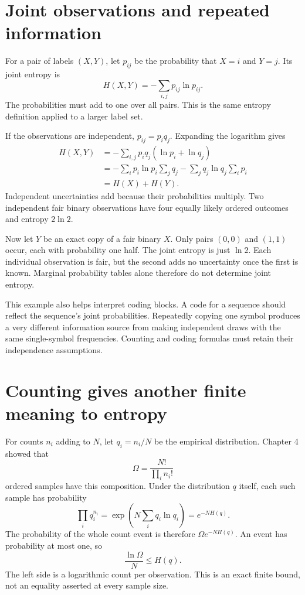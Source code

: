 \documentclass[11pt,oneside,openany]{book}
\theoremstyle{definition}
\theoremstyle{remark}
\numberwithin{equation}{chapter}
\begin{document}
\section{Joint observations and repeated information}\label{ch05-joint-observations-and-repeated-information}

For a pair of labels \((X,Y)\), let \(p_{ij}\) be the probability that \(X=i\) and \(Y=j\). Its joint entropy is \[H(X,Y)=-\sum_{i,j}p_{ij}\ln p_{ij}.\] The probabilities must add to one over all pairs. This is the same entropy definition applied to a larger label set.

If the observations are independent, \(p_{ij}=p_iq_j\). Expanding the logarithm gives \[\begin{aligned}
H(X,Y)
&=-\sum_{i,j}p_iq_j(\ln p_i+\ln q_j)\\
&=-\sum_i p_i\ln p_i\sum_jq_j
-\sum_jq_j\ln q_j\sum_i p_i\\
&=H(X)+H(Y).
\end{aligned}\] Independent uncertainties add because their probabilities multiply. Two independent fair binary observations have four equally likely ordered outcomes and entropy \(2\ln2\).

Now let \(Y\) be an exact copy of a fair binary \(X\). Only pairs \((0,0)\) and \((1,1)\) occur, each with probability one half. The joint entropy is just \(\ln2\). Each individual observation is fair, but the second adds no uncertainty once the first is known. Marginal probability tables alone therefore do not determine joint entropy.

This example also helps interpret coding blocks. A code for a sequence should reflect the sequence's joint probabilities. Repeatedly copying one symbol produces a very different information source from making independent draws with the same single-symbol frequencies. Counting and coding formulas must retain their independence assumptions.

\section{Counting gives another finite meaning to entropy}\label{ch05-counting-gives-another-finite-meaning-to-entropy}

For counts \(n_i\) adding to \(N\), let \(q_i=n_i/N\) be the empirical distribution. Chapter 4 showed that \[\Omega=\frac{N!}{\prod_i n_i!}\] ordered samples have this composition. Under the distribution \(q\) itself, each such sample has probability \[\prod_i q_i^{n_i}
=\exp\left(N\sum_i q_i\ln q_i\right)=e^{-NH(q)}.\] The probability of the whole count event is therefore \(\Omega e^{-NH(q)}\). An event has probability at most one, so \[\boxed{\frac{\ln\Omega}{N}\leq H(q).}\] The left side is a logarithmic count per observation. This is an exact finite bound, not an equality asserted at every sample size.
\end{document}
